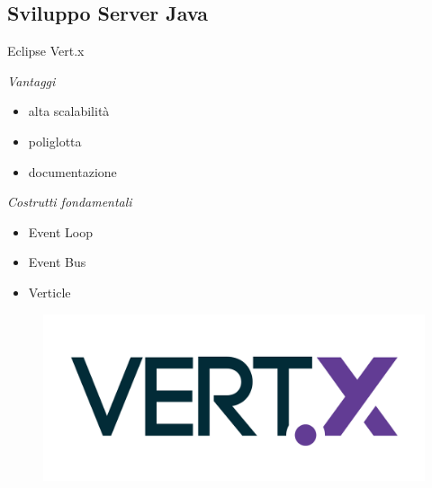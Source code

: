	\subsection{Sviluppo Server Java}
	\begin{frame}{Eclipse Vert.x}
		\begin{minipage}{0.5\textwidth}
			\emph{Vantaggi}
						\begin{itemize}
							\item alta scalabilità
							\item poliglotta
							\item documentazione
						\end{itemize}
			\emph{Costrutti fondamentali}
				\begin{itemize}
					\item Event Loop
					\item Event Bus
					\item Verticle
				\end{itemize}
			\end{minipage}
			\begin{minipage}{0.3\textwidth}
					\begin{figure}
						\includegraphics[width=1.2\textwidth]{capitolo_3/immagini/Vertx.png}
					\end{figure}
				\end{minipage}
			\end{frame}
